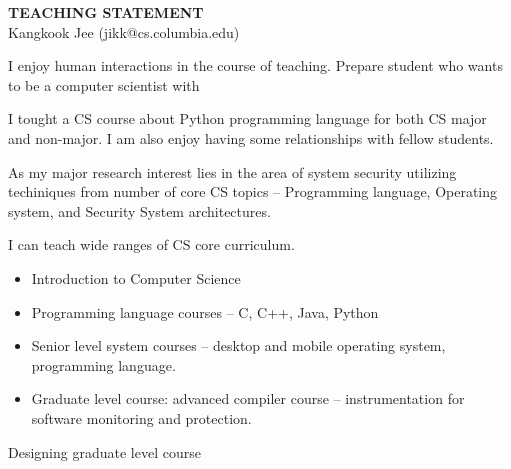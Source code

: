 \documentclass[letterpaper, 10pt]{article}
\begin{document}
\thispagestyle{fancy}

\lhead{}
\rhead{}

\renewcommand{\headrulewidth}{0pt} 
\renewcommand{\footrulewidth}{0pt} 

\fancyfoot[C]{\footnotesize
\textcolor{gray}{http://www.cs.columbia.edu/$\sim$jikk/application}} 

\pagestyle{fancy}
\lhead{\textcolor{gray}{\it Kangkook Jee}}
\rhead{\textcolor{gray}{\thepage /\pageref{LastPage}}}

\begin{small}

\begin{center}
{\LARGE \bf TEACHING STATEMENT}\\
\vspace*{0.1cm}
{\normalsize Kangkook Jee (jikk@cs.columbia.edu)}
\end{center}
I enjoy human interactions in the course of teaching.
%
Prepare student who wants to be a computer scientist with

I tought a CS course about Python programming language for both CS major and
non-major.
%
I am also enjoy having some relationships with fellow students.
%

As my major research interest lies in the area of system security utilizing 
techiniques from number of core CS topics -- Programming language, Operating
system, and Security System architectures.

I can teach wide ranges of CS core curriculum.
\begin{itemize}
\item Introduction to Computer Science
\item Programming language courses -- C, C++, Java, Python 
\item Senior level system courses -- desktop and mobile operating system,
  programming language.
\item Graduate level course: advanced compiler course -- instrumentation for
  software monitoring and protection.
\end{itemize}

Designing graduate level course 

\end{small}
\end{document}
